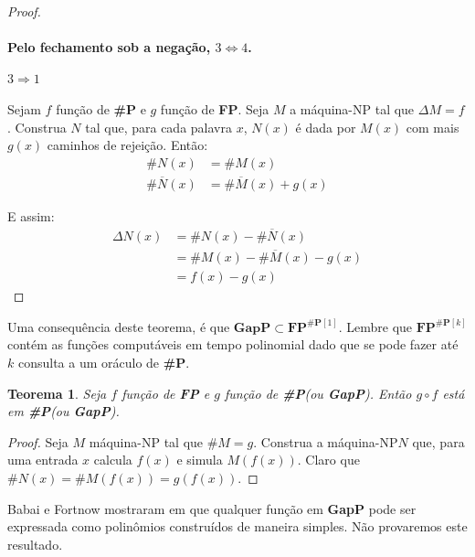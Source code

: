 \documentclass[paper=a4, fontsize=11pt]{scrartcl} %
\newtheorem{theorem}{Teorema}
\numberwithin{equation}{subsection}
\numberwithin{figure}{subsection}
\numberwithin{table}{subsection}
\numberwithin{definition}{subsection}
\numberwithin{theorem}{subsection}
\numberwithin{property}{subsection}
\numberwithin{proposition}{subsection}
\newcommand{\SP}{\textbf{\#P}\xspace}
\newcommand{\FP}{\textbf{FP}\xspace}
\newcommand{\gP}{\textbf{GapP}\xspace}
\newcommand{\npmach}{máquina-NP\xspace}
\newcommand{\del}[1]{\Delta #1}
\renewcommand{\bar}[1]{\overline{#1}}
\begin{document}
\begin{proof}
\paragraph{Pelo fechamento sob a negação, $3 \Leftrightarrow 4$.}

\paragraph{$3 \Rightarrow 1$}
Sejam $f$ função de \SP e $g$ função de \FP. Seja $M$ a \npmach tal que $\del M = f$. Construa $N$ tal que, para cada palavra $x$, $N(x)$ é dada por $M(x)$ com mais $g(x)$ caminhos de rejeição. Então:
\begin{align*}
\# N(x)       &= \# M(x) \\
\# \bar{N}(x) &= \# \bar{M} (x)  + g(x)
\end{align*}

E assim:
\begin{align*}
\del N(x) &= \# N(x) - \# \bar{N}(x) \\
          &= \# M(x) - \# \bar{M} (x) - g(x) \\
          &= f(x) - g(x)
\end{align*}
\end{proof}

Uma consequência deste teorema, é que $\gP \subset \FP^{\SP[1]}$. Lembre que $\FP^{\SP[k]}$ contém as funções computáveis em tempo polinomial dado que se pode fazer até $k$ consulta a um oráculo de \SP.

\begin{theorem}
Seja $f$ função de \FP e $g$ função de \SP (ou \gP). Então $g \circ f$ está em \SP (ou \gP).
\end{theorem}
\begin{proof}
Seja $M$ \npmach tal que $\# M = g$. Construa a \npmach $N$ que, para uma entrada $x$ calcula $f(x)$ e simula $M(f(x))$. Claro que $\# N(x) = \# M(f(x)) = g(f(x))$.

\end{proof}

Babai e Fortnow mostraram em \cite{Babai91} que qualquer função em \gP pode ser expressada como polinômios construídos de maneira simples. Não provaremos este resultado.
\end{document}
